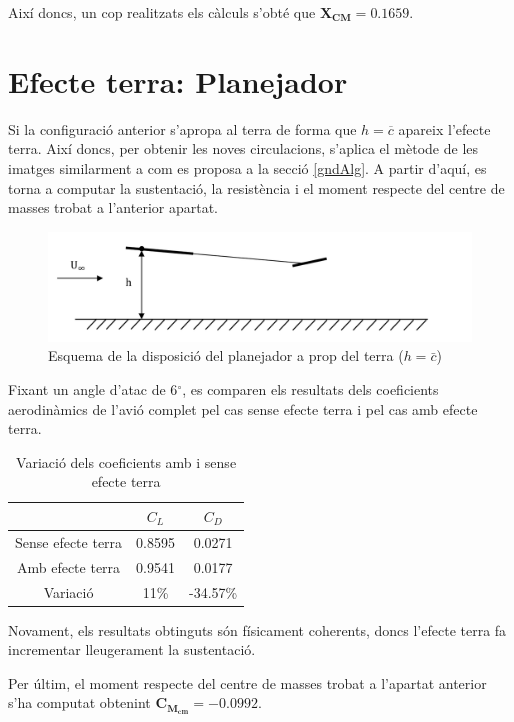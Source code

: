 Així doncs, un cop realitzats els càlculs s'obté  que $\bm{X_{CM} = 0.1659}$.

\section{Efecte terra: Planejador}
Si la configuració anterior s'apropa al terra de forma que $h = \overline{c}$ apareix l'efecte terra. Així doncs, per obtenir les noves circulacions, s'aplica el mètode de les imatges similarment a com es proposa a la secció \ref{gndAlg}. A partir d'aquí, es torna a computar la sustentació, la resistència  i el moment respecte del centre de masses trobat a l'anterior apartat.
\begin{figure}[H]
	\centering
	\includegraphics[scale=0.35]{./plots/terraGlider}
	\caption[Esquema de la posició de l'ala sobre el terra ($h=\bar{c}$)]{Esquema de la disposició del planejador a prop del terra ($h=\bar{c}$) \cite{LizandraDalmases2017a}}
	\label{GroundEffectGlider}
\end{figure}

Fixant un angle d'atac de 6$^{\circ}$, es comparen els resultats dels coeficients aerodinàmics de l'avió complet pel cas sense efecte terra i pel cas amb efecte terra.
\begin{table} [H]
	\centering
	\begin{tabular}{| c | c | c |}	
		\hline
		& $C_{L}$ & $C_{D}$  \\
		\hline
		Sense efecte terra & 0.8595 & 0.0271 \\
		\hline
		Amb efecte terra & 0.9541 & 0.0177 \\
		\hline
		Variació & 11\% & -34.57\% \\
		\hline
	\end{tabular}
\caption{Variació dels coeficients amb i sense efecte terra} \label{NoGroundvsGroundGlider}
\end{table}
Novament, els resultats obtinguts són físicament coherents, doncs l'efecte terra fa incrementar lleugerament la sustentació.

Per últim, el moment respecte del centre de masses trobat a l'apartat anterior s'ha computat obtenint $\bm{C_{M_{cm}} = -0.0992 }$.
